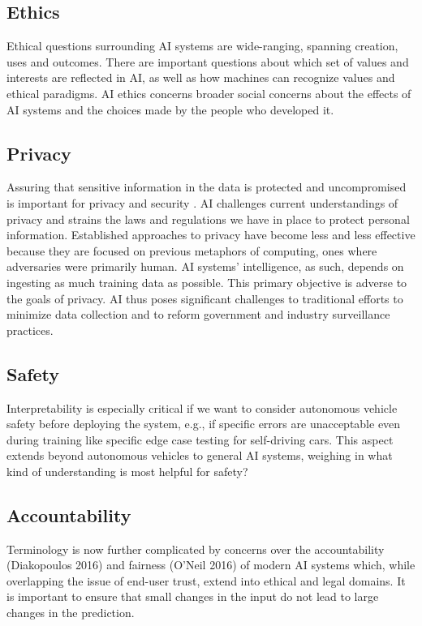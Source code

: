 \subsection{Ethics}

Ethical questions surrounding AI systems are wide-ranging, spanning creation, uses and outcomes. There are important questions about which set of values and interests are reflected in AI, as well as how machines can recognize values and ethical paradigms. AI ethics concerns broader social concerns about the effects of AI systems and the choices made by the people who developed it.

\subsection{Privacy}
Assuring that sensitive information in the data is protected and uncompromised is important for privacy and security \cite{molnar}. AI challenges current understandings of privacy and strains the laws and regulations we have in place to protect personal information. Established approaches to privacy have become less and less effective because they are focused on previous metaphors of computing, ones where adversaries were primarily human. AI systems’ intelligence, as such, depends on ingesting as much training data as possible. This primary objective is adverse to the goals of privacy. AI thus poses significant challenges to traditional efforts to minimize data collection and to reform government and industry surveillance practices. 

\subsection{Safety}
Interpretability is especially critical if we want to consider autonomous vehicle safety before deploying the system, e.g., if specific errors are unacceptable even during training like specific edge case testing for self-driving cars. This aspect extends beyond autonomous vehicles to general AI systems, weighing in what kind of understanding is most helpful for safety?

\subsection{Accountability}
Terminology is now further complicated by concerns over the accountability (Diakopoulos 2016) and fairness (O’Neil 2016) of modern AI systems which, while overlapping the issue of end-user trust, extend into ethical and legal domains. It is important to ensure that small changes in the input do not lead to large changes in the prediction.

